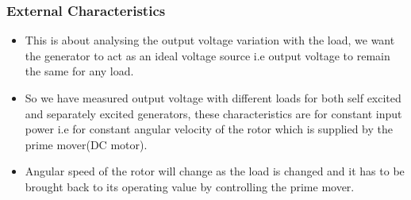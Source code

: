 \documentclass[12pt]{article}
\begin{document}
            \subsubsection{External Characteristics}
                \begin{itemize}
                    \item This is about analysing the output voltage variation with the load, we want the generator to act as an ideal voltage source i.e output voltage to remain the same for any load.
                    \item So we have measured output voltage with different loads for both self excited and separately excited generators, these characteristics are for constant input power i.e for constant angular velocity of the rotor which is supplied by the prime mover(DC motor).
                    \item Angular speed of the rotor will change as the load is changed and it has to be brought back to its operating value by controlling the prime mover.
                \end{itemize}
                
\end{document}

